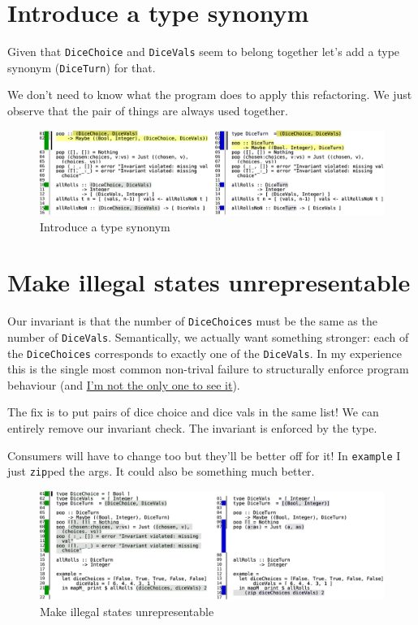 \section{Introduce a type synonym}


Given that \texttt{DiceChoice} and \texttt{DiceVals} seem to belong together let's add a type synonym (\texttt{DiceTurn}) for that.

We don't need to know what the program does to apply this refactoring. We just observe that the pair of things are always used together.

\begin{figure}[htbp]
 \centering
 \includegraphics[width=\linewidth]{./pics/diff10.pdf}
 \caption{Introduce a type synonym}
 \label{fig:diff10}
\end{figure}


\section{Make illegal states unrepresentable}


Our invariant is that the number of \texttt{DiceChoices} must be the same as the number of \texttt{DiceVals}. Semantically, we actually want something stronger: each of the \texttt{DiceChoices} corresponds to exactly one of the \texttt{DiceVals}. In my experience this is the single most common non-trival failure to structurally enforce program behaviour (and \href{https://twitter.com/fried_brice/status/1178140883633479680}{I'm not the only one to see it}).

The fix is to put pairs of dice choice and dice vals in the same list! We can entirely remove our invariant check. The invariant is enforced by the type.

Consumers will have to change too but they'll be better off for it! In \texttt{example} I just \texttt{zip}ped the args. It could also be something much better.

\begin{figure}[htbp]
 \centering
 \includegraphics[width=\linewidth]{./pics/diff11.pdf}
 \caption{Make illegal states unrepresentable}
 \label{fig:diff11}
\end{figure}

